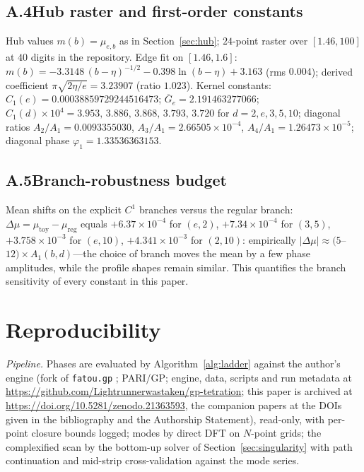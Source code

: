 \documentclass[11pt,a4paper]{article}
\theoremstyle{definition}
\theoremstyle{remark}
\begin{document}
\subsection*{A.4\quad Hub raster and first-order constants}

Hub values $m(b)=\mu_{e,b}$ as in Section~\ref{sec:hub}; $24$-point raster over
$[1.46,100]$ at $40$ digits in the repository. Edge fit on $[1.46,1.6]$:
$m(b)=-3.3148\,(b-\eta)^{-1/2}-0.398\ln(b-\eta)+3.163$ (rms $0.004$);
derived coefficient $\pi\sqrt{2\eta/e}=3.23907$ (ratio $1.023$). Kernel constants:
$C_1(e)=0.00038859729244516473$; $\overline G_e=2.191463277066$;
$C_1(d)\times10^4=3.953,\,3.886,\,3.868,\,3.793,\,3.720$ for $d=2,e,3,5,10$;
diagonal ratios $A_2/A_1=0.0093355030$, $A_3/A_1=2.66505\times10^{-4}$,
$A_4/A_1=1.26473\times10^{-5}$; diagonal phase $\varphi_1=1.33536363153$.

\subsection*{A.5\quad Branch-robustness budget}

Mean shifts on the explicit $C^1$ branches versus the regular branch:
$\Delta\mu=\mu_{\mathrm{toy}}-\mu_{\mathrm{reg}}$ equals $+6.37\times10^{-4}$ for $(e,2)$,
$+7.34\times10^{-4}$ for $(3,5)$, $+3.758\times10^{-3}$ for $(e,10)$,
$+4.341\times10^{-3}$ for $(2,10)$: empirically $\lvert\Delta\mu\rvert\approx(5$--$12)\times
A_1(b,d)$---the choice of branch moves the mean by a few phase amplitudes, while the profile
shapes remain similar. This quantifies the branch sensitivity of every constant in this
paper.

\section{Reproducibility}\label{app:repro}

\emph{Pipeline.} Phases are evaluated by Algorithm~\ref{alg:ladder} against the author's
engine (fork of \texttt{fatou.gp} \cite{fatou}; PARI/GP; engine, data, scripts and run
metadata at \url{https://github.com/Lightrunnerwastaken/gp-tetration}; this paper is archived at \url{https://doi.org/10.5281/zenodo.21363593}, the companion papers at the DOIs given in the bibliography and the Authorship Statement), read-only, with per-point closure
bounds logged; modes by direct DFT on $N$-point grids; the complexified scan by the
bottom-up solver of Section~\ref{sec:singularity} with path continuation and mid-strip
cross-validation against the mode series.
\end{document}
